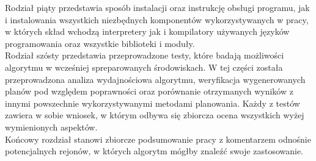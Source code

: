 	Rodział piąty przedstawia sposób instalacji oraz instrukcję obsługi programu, jak i instalowania wszystkich
niezbędnych komponentów wykorzystywanych w pracy, w których skład wchodzą interpretery jak i kompilatory używanych języków programowania oraz 
wszystkie biblioteki i moduły.
\\

	Rodział szósty przedstawia przeprowadzone testy, które badają możliwości algorytmu w wcześniej spreparowanych środowiskach. W tej części została
przeprowadzona analiza wydajnościowa algorytmu, weryfikacja wygenerowanych planów pod względem poprawności oraz porównanie otrzymanych wyników
z innymi powszechnie wykorzystywanymi metodami planowania. Każdy z testów zawiera w sobie wniosek, w którym odbywa się zbiorcza
ocena wszystkich wyżej wymienionych aspektów.
\\

	Końcowy rozdział stanowi zbiorcze podsumowanie pracy z komentarzem odnośnie potencjalnych rejonów, w których algorytm mógłby znaleźć swoje
zastosowanie. 

